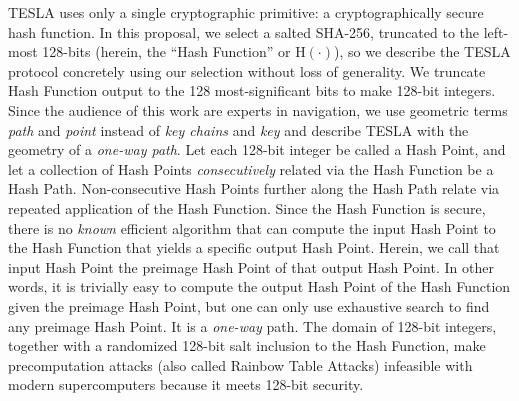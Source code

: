 \documentclass[letterpaper,times]{IONconf/IONconf}
\begin{document}
		TESLA uses only a single cryptographic primitive: a cryptographically secure hash function.
		In this proposal, we select a salted SHA-256, truncated to the left-most 128-bits (herein, the ``Hash Function'' or $\textrm{H}(\cdot)$), so we describe the TESLA protocol concretely using our selection without loss of generality.
		We truncate Hash Function output to the 128 most-significant bits to make 128-bit integers.
		Since the audience of this work are experts in navigation, we use geometric terms {\em path} and {\em point} instead of {\em key chains} and {\em key} and describe TESLA with the geometry of a {\em one-way path}.
		Let each 128-bit integer be called a Hash Point, and let a collection of Hash Points {\em consecutively} related via the Hash Function be a Hash Path.
		Non-consecutive Hash Points further along the Hash Path relate via repeated application of the Hash Function.
		Since the Hash Function is secure, there is no {\em known} efficient algorithm that can compute the input Hash Point to the Hash Function that yields a specific output Hash Point.
		Herein, we call that input Hash Point the preimage Hash Point of that output Hash Point.
		In other words, it is trivially easy to compute the output Hash Point of the Hash Function given the preimage Hash Point, but one can only use exhaustive search to find any preimage Hash Point.
		It is a {\em one-way} path.
		The domain of 128-bit integers, together with a randomized 128-bit salt inclusion to the Hash Function, make precomputation attacks (also called Rainbow Table Attacks) infeasible with modern supercomputers because it meets 128-bit security.
\end{document}
